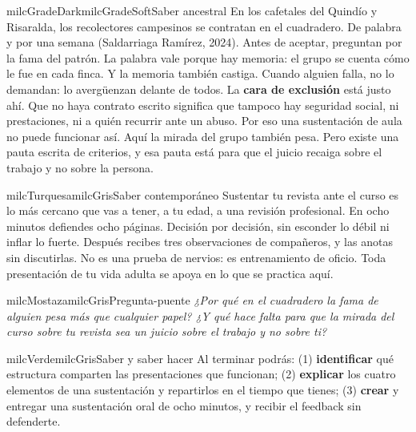 \documentclass[11pt,letterpaper]{article}
\begin{document}
\begin{softbox}{milcGradeDark}{milcGradeSoft}{Saber ancestral}
En los cafetales del Quindío y Risaralda, los recolectores campesinos se contratan en el cuadradero. De palabra y por una semana (Saldarriaga Ramírez, 2024). Antes de aceptar, preguntan por la fama del patrón. La palabra vale porque hay memoria: el grupo se cuenta cómo le fue en cada finca. Y la memoria también castiga. Cuando alguien falla, no lo demandan: lo avergüenzan delante de todos. La \textbf{cara de exclusión} está justo ahí. Que no haya contrato escrito significa que tampoco hay seguridad social, ni prestaciones, ni a quién recurrir ante un abuso. Por eso una sustentación de aula no puede funcionar así. Aquí la mirada del grupo también pesa. Pero existe una pauta escrita de criterios, y esa pauta está para que el juicio recaiga sobre el trabajo y no sobre la persona.\par{}
\end{softbox}

\begin{softbox}{milcTurquesa}{milcGris}{Saber contemporáneo}
Sustentar tu revista ante el curso es lo más cercano que vas a tener, a tu edad, a una revisión profesional. En ocho minutos defiendes ocho páginas. Decisión por decisión, sin esconder lo débil ni inflar lo fuerte. Después recibes tres observaciones de compañeros, y las anotas sin discutirlas. No es una prueba de nervios: es entrenamiento de oficio. Toda presentación de tu vida adulta se apoya en lo que se practica aquí.
\end{softbox}

\begin{softbox}{milcMostaza}{milcGris}{Pregunta-puente}
\textit{¿Por qué en el cuadradero la fama de alguien pesa más que cualquier papel? ¿Y qué hace falta para que la mirada del curso sobre tu revista sea un juicio sobre el trabajo y no sobre ti?}
\end{softbox}

\begin{softbox}{milcVerde}{milcGris}{Saber y saber hacer}
Al terminar podrás: (1) \textbf{identificar} qué estructura comparten las presentaciones que funcionan; (2) \textbf{explicar} los cuatro elementos de una sustentación y repartirlos en el tiempo que tienes; (3) \textbf{crear} y entregar una sustentación oral de ocho minutos, y recibir el feedback sin defenderte.
\end{softbox}
\end{document}
